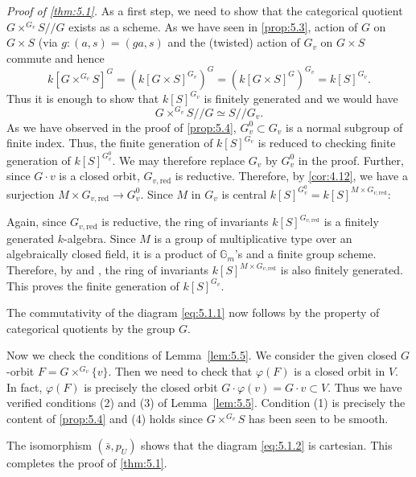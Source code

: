 \documentclass[11pt,a4paper]{article}
\theoremstyle{plain}
\theoremstyle{definition}
\newcommand{\G}{\mathbb{G}}
\newcommand{\red}{\mathrm{red}}
\begin{document}
\textit{Proof of \ref{thm:5.1}.} As a first step, we need to show that the categorical quotient $G \times^{G_v} S /\!/ G$ exists as a scheme. As we have seen in \ref{prop:5.3}, action of $G$ on $G \times S$ (via $g : (a, s) = (ga, s)$ and the (twisted) action of $G_v$ on $G \times S$ commute and hence
\begin{equation} \label{eq:5.5.1}
k[G \times^{G_v} S]^G = (k[G \times S]^{G_v})^G = (k[G \times S]^G)^{G_v} = k[S]^{G_v}.
\end{equation}
Thus it is enough to show that $k[S]^{G_v}$ is finitely generated and we would have
\begin{equation} \label{eq:5.5.2}
G \times^{G_v} S /\!/ G \simeq S /\!/ G_v.
\end{equation}
As we have observed in the proof of \ref{prop:5.4}, $G_v^0 \subset G_v$ is a normal subgroup of finite index. Thus, the finite generation of $k[S]^{G_v}$ is reduced to checking finite generation of $k[S]^{G_v^0}$. We may therefore replace $G_v$ by $G_v^0$ in the proof. Further, since $G \cdot v$ is a closed orbit, $G_{v,\red}$ is reductive. Therefore, by \ref{cor:4.12}, we have a surjection $M \times G_{v,\red} \to G_v^0$. Since $M$ in $G_v$ is central $k[S]^{G_v^0} = k[S]^{M \times G_{v,\red}}$:

Again, since $G_{v,\red}$ is reductive, the ring of invariants $k[S]^{G_{v,\red}}$ is a finitely generated $k$-algebra. Since $M$ is a group of multiplicative type over an algebraically closed field, it is a product of $\G_m$'s and a finite group scheme. Therefore, by \cite[Theorem~1.1]{GIT} and \cite[Page~113]{AV}, the ring of invariants $k[S]^{M \times G_{v,\red}}$ is also finitely generated. This proves the finite generation of $k[S]^{G_v}$.

The commutativity of the diagram \eqref{eq:5.1.1} now follows by the property of categorical quotients by the group $G$.

Now we check the conditions of Lemma~\ref{lem:5.5}. We consider the given closed $G$-orbit $F = G \times^{G_v} \{v\}$. Then we need to check that $\varphi(F)$ is a closed orbit in $V$. In fact, $\varphi(F)$ is precisely the closed orbit $G \cdot \varphi(v) = G \cdot v \subset V$. Thus we have verified conditions (2) and (3) of Lemma~\ref{lem:5.5}. Condition (1) is precisely the content of \ref{prop:5.4} and (4) holds since $G \times^{G_v} S$ has been seen to be smooth.

The isomorphism $(\bar{s}, p_U)$ shows that the diagram \eqref{eq:5.1.2} is cartesian. This completes the proof of \ref{thm:5.1}. \qedhere
\end{document}
